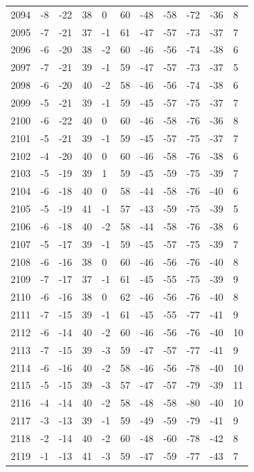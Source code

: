 \begin{table}[H]
\begin{tabular}{lllllllllll}
2094 & -8 & -22 & 38 & 0 & 60 & -48 & -58 & -72 & -36 & 8 \\
2095 & -7 & -21 & 37 & -1 & 61 & -47 & -57 & -73 & -37 & 7 \\
2096 & -6 & -20 & 38 & -2 & 60 & -46 & -56 & -74 & -38 & 6 \\
2097 & -7 & -21 & 39 & -1 & 59 & -47 & -57 & -73 & -37 & 5 \\
2098 & -6 & -20 & 40 & -2 & 58 & -46 & -56 & -74 & -38 & 6 \\
2099 & -5 & -21 & 39 & -1 & 59 & -45 & -57 & -75 & -37 & 7 \\
2100 & -6 & -22 & 40 & 0 & 60 & -46 & -58 & -76 & -36 & 8 \\
2101 & -5 & -21 & 39 & -1 & 59 & -45 & -57 & -75 & -37 & 7 \\
2102 & -4 & -20 & 40 & 0 & 60 & -46 & -58 & -76 & -38 & 6 \\
2103 & -5 & -19 & 39 & 1 & 59 & -45 & -59 & -75 & -39 & 7 \\
2104 & -6 & -18 & 40 & 0 & 58 & -44 & -58 & -76 & -40 & 6 \\
2105 & -5 & -19 & 41 & -1 & 57 & -43 & -59 & -75 & -39 & 5 \\
2106 & -6 & -18 & 40 & -2 & 58 & -44 & -58 & -76 & -38 & 6 \\
2107 & -5 & -17 & 39 & -1 & 59 & -45 & -57 & -75 & -39 & 7 \\
2108 & -6 & -16 & 38 & 0 & 60 & -46 & -56 & -76 & -40 & 8 \\
2109 & -7 & -17 & 37 & -1 & 61 & -45 & -55 & -75 & -39 & 9 \\
2110 & -6 & -16 & 38 & 0 & 62 & -46 & -56 & -76 & -40 & 8 \\
2111 & -7 & -15 & 39 & -1 & 61 & -45 & -55 & -77 & -41 & 9 \\
2112 & -6 & -14 & 40 & -2 & 60 & -46 & -56 & -76 & -40 & 10 \\
2113 & -7 & -15 & 39 & -3 & 59 & -47 & -57 & -77 & -41 & 9 \\
2114 & -6 & -16 & 40 & -2 & 58 & -46 & -56 & -78 & -40 & 10 \\
2115 & -5 & -15 & 39 & -3 & 57 & -47 & -57 & -79 & -39 & 11 \\
2116 & -4 & -14 & 40 & -2 & 58 & -48 & -58 & -80 & -40 & 10 \\
2117 & -3 & -13 & 39 & -1 & 59 & -49 & -59 & -79 & -41 & 9 \\
2118 & -2 & -14 & 40 & -2 & 60 & -48 & -60 & -78 & -42 & 8 \\
2119 & -1 & -13 & 41 & -3 & 59 & -47 & -59 & -77 & -43 & 7 \\

\end{tabular}
\end{table}
